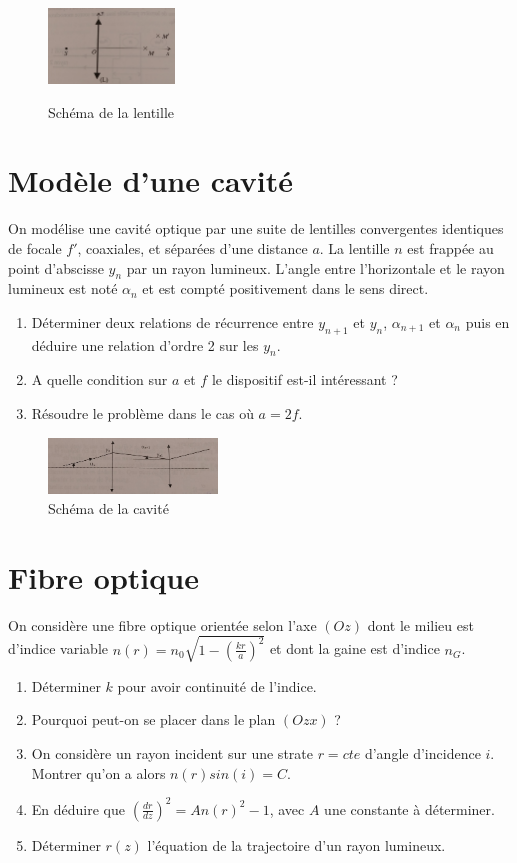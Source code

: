 \documentclass{article}
\begin{document}
\begin{figure}[h]
  \centering
  \includegraphics[width=0.3\textwidth]{exercice 1.jpg}
  \label{fig:ex}
    \caption{Schéma de la lentille}
\end{figure}


\section{Modèle d'une cavité}

On modélise une cavité optique par une suite de lentilles convergentes identiques de focale $f'$, coaxiales, et séparées d'une distance $a$. 
La lentille $n$ est frappée au point d'abscisse $y_n$ par un rayon lumineux.
L'angle entre l'horizontale et le rayon lumineux est noté $\alpha_n$ et est compté positivement dans le sens direct. 
\begin{enumerate}
  \item Déterminer deux relations de récurrence entre $y_{n+1}$ et $y_n$, $\alpha_{n+1}$ et $\alpha_n$ puis en déduire une relation d'ordre 2 sur les $y_n$. 
  \item A quelle condition sur $a$ et $f$ le dispositif est-il intéressant ? 
  \item Résoudre le problème dans le cas où $a=2f$.
\end{enumerate}

\begin{figure}[h!]
  \centering
  \includegraphics[width=0.4\textwidth]{exercice 2.jpg}
    \caption{Schéma de la cavité}
\end{figure}


\section{Fibre optique}

On considère une fibre optique orientée selon l'axe $(Oz)$ dont le milieu est d'indice variable $n(r)=n_0 \sqrt{1-(\frac{kr}{a})^2}$ et dont la gaine est d'indice $n_G$. 
\begin{enumerate}
  \item Déterminer $k$ pour avoir continuité de l'indice. 
  \item Pourquoi peut-on se placer dans le plan $(Ozx)$ ? 
  \item On considère un rayon incident sur une strate $r=cte$ d'angle d'incidence $i$. Montrer qu'on a alors $n(r)sin(i) = C$. 
  \item En déduire que $(\frac{dr}{dz})^2 = A n(r)^2 - 1$, avec $A$ une constante à déterminer. 
  \item Déterminer $r(z)$ l'équation de la trajectoire d'un rayon lumineux. 
\end{enumerate}
\end{document}
